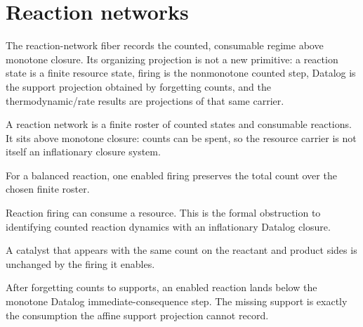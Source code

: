 \section{Reaction networks}

The reaction-network fiber records the counted, consumable regime above
monotone closure.  Its organizing projection is not a new primitive: a reaction
state is a finite resource state, firing is the nonmonotone counted step,
Datalog is the support projection obtained by forgetting counts, and the
thermodynamic/rate results are projections of that same carrier.

\begin{proposition}\label{thm:reaction-network-carrier}\leanok{}
A reaction network is a finite roster of counted states and consumable
reactions.  It sits above monotone closure: counts can be spent, so the
resource carrier is not itself an inflationary closure system.
\end{proposition}

\begin{theorem}\label{thm:reaction-mass-conserved}\leanok{}
For a balanced reaction, one enabled firing preserves the total count over the
chosen finite roster.
\end{theorem}

\begin{theorem}\label{thm:reaction-fire-not-monotone}\leanok{}
Reaction firing can consume a resource.  This is the formal obstruction to
identifying counted reaction dynamics with an inflationary Datalog closure.
\end{theorem}

\begin{theorem}\label{thm:reaction-catalyst-fixed}\leanok{}
A catalyst that appears with the same count on the reactant and product sides
is unchanged by the firing it enables.
\end{theorem}

\begin{theorem}\label{thm:reaction-support-projection}\leanok{}
After forgetting counts to supports, an enabled reaction lands below the
monotone Datalog immediate-consequence step.  The missing support is exactly
the consumption the affine support projection cannot record.
\end{theorem}

